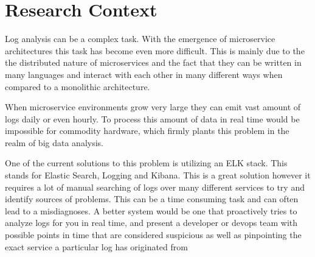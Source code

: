 \section{Research Context}

Log analysis can be a complex task. With the emergence of microservice architectures this task has become even more difficult. This is mainly due to the the distributed nature of microservices and the fact that they can be written in many languages and interact with each other in many different ways when compared to a monolithic architecture.

When microservice environments grow very large they can emit vast amount of logs daily or even hourly. To process this amount of data in real time would be impossible for commodity hardware, which firmly plants this problem in the realm of big data analysis.

One of the current solutions to this problem is utilizing an ELK stack. This stands for Elastic Search, Logging and Kibana. This is a great solution however it requires a lot of manual searching of logs over many different services to try and identify sources of problems. This can be a time consuming task and can often lead to a misdiagnoses. A better system would be one that proactively tries to analyze logs for you in real time, and present a developer or devops team with possible points in time that are considered suspicious as well as pinpointing the exact service a particular log has originated from